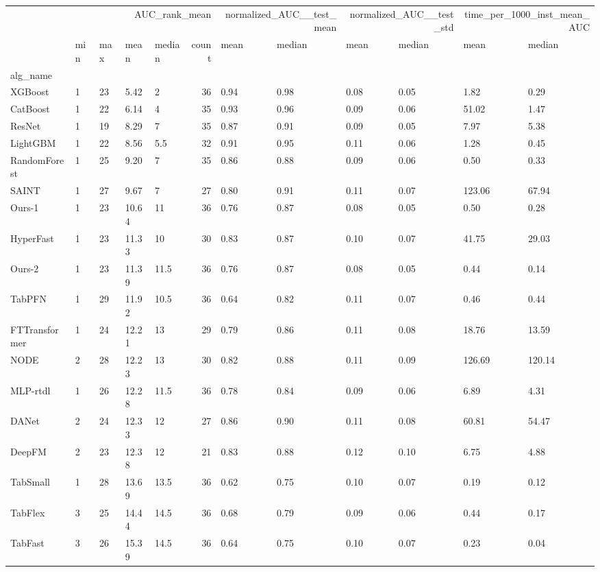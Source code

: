 \begin{tabular}{lllllrllllll}
\toprule
 & \multicolumn{5}{r}{AUC_rank_mean} & \multicolumn{2}{r}{normalized_AUC__test_mean} & \multicolumn{2}{r}{normalized_AUC__test_std} & \multicolumn{2}{r}{time_per_1000_inst_mean_AUC} \\
 & min & max & mean & median & count & mean & median & mean & median & mean & median \\
alg_name &  &  &  &  &  &  &  &  &  &  &  \\
\midrule
XGBoost & 1 & 23 & 5.42 & 2 & 36 & 0.94 & 0.98 & 0.08 & 0.05 & 1.82 & 0.29 \\
CatBoost & 1 & 22 & 6.14 & 4 & 35 & 0.93 & 0.96 & 0.09 & 0.06 & 51.02 & 1.47 \\
ResNet & 1 & 19 & 8.29 & 7 & 35 & 0.87 & 0.91 & 0.09 & 0.05 & 7.97 & 5.38 \\
LightGBM & 1 & 22 & 8.56 & 5.5 & 32 & 0.91 & 0.95 & 0.11 & 0.06 & 1.28 & 0.45 \\
RandomForest & 1 & 25 & 9.20 & 7 & 35 & 0.86 & 0.88 & 0.09 & 0.06 & 0.50 & 0.33 \\
SAINT & 1 & 27 & 9.67 & 7 & 27 & 0.80 & 0.91 & 0.11 & 0.07 & 123.06 & 67.94 \\
Ours-1 & 1 & 23 & 10.64 & 11 & 36 & 0.76 & 0.87 & 0.08 & 0.05 & 0.50 & 0.28 \\
HyperFast & 1 & 23 & 11.33 & 10 & 30 & 0.83 & 0.87 & 0.10 & 0.07 & 41.75 & 29.03 \\
Ours-2 & 1 & 23 & 11.39 & 11.5 & 36 & 0.76 & 0.87 & 0.08 & 0.05 & 0.44 & 0.14 \\
TabPFN & 1 & 29 & 11.92 & 10.5 & 36 & 0.64 & 0.82 & 0.11 & 0.07 & 0.46 & 0.44 \\
FTTransformer & 1 & 24 & 12.21 & 13 & 29 & 0.79 & 0.86 & 0.11 & 0.08 & 18.76 & 13.59 \\
NODE & 2 & 28 & 12.23 & 13 & 30 & 0.82 & 0.88 & 0.11 & 0.09 & 126.69 & 120.14 \\
MLP-rtdl & 1 & 26 & 12.28 & 11.5 & 36 & 0.78 & 0.84 & 0.09 & 0.06 & 6.89 & 4.31 \\
DANet & 2 & 24 & 12.33 & 12 & 27 & 0.86 & 0.90 & 0.11 & 0.08 & 60.81 & 54.47 \\
DeepFM & 2 & 23 & 12.38 & 12 & 21 & 0.83 & 0.88 & 0.12 & 0.10 & 6.75 & 4.88 \\
TabSmall & 1 & 28 & 13.69 & 13.5 & 36 & 0.62 & 0.75 & 0.10 & 0.07 & 0.19 & 0.12 \\
TabFlex & 3 & 25 & 14.44 & 14.5 & 36 & 0.68 & 0.79 & 0.09 & 0.06 & 0.44 & 0.17 \\
TabFast & 3 & 26 & 15.39 & 14.5 & 36 & 0.64 & 0.75 & 0.10 & 0.07 & 0.23 & 0.04 \\

\end{tabular}
